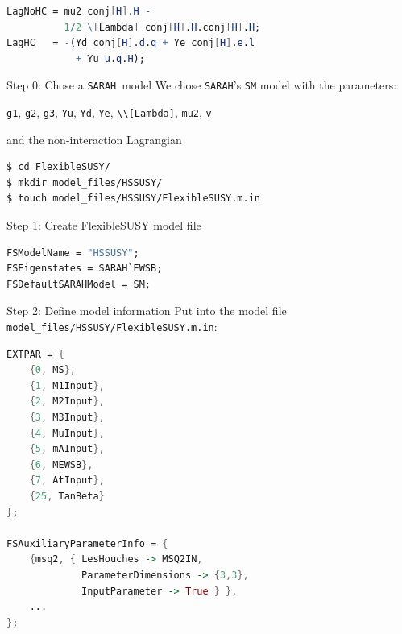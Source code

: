 \documentclass[hyperref={pdfpagelabels=false},ngerman]{beamer}
\newcommand{\SARAH}{\texttt{SARAH}}
\begin{document}
\newsavebox{\listbox}

\begin{lrbox}{\listbox}\begin{lstlisting}[language=Mathematica]
LagNoHC = mu2 conj[H].H -
          1/2 \[Lambda] conj[H].H.conj[H].H;
LagHC   = -(Yd conj[H].d.q + Ye conj[H].e.l
            + Yu u.q.H);
\end{lstlisting}\end{lrbox}

\begin{frame}{Step 0: Chose a \SARAH\ model}
  We chose \SARAH's \texttt{SM} model with the parameters:
  \begin{center}
  \lstinline{g1}, \lstinline{g2}, \lstinline{g3}, \lstinline{Yu},
  \lstinline{Yd}, \lstinline{Ye}, \lstinline{\\[Lambda]},
  \lstinline{mu2}, \lstinline{v}
  \end{center}
  and the non-interaction Lagrangian \\[2em]
  \usebox{\listbox}
\end{frame}

\begin{lrbox}{\listbox}\begin{lstlisting}[language=bash]
$ cd FlexibleSUSY/
$ mkdir model_files/HSSUSY/
$ touch model_files/HSSUSY/FlexibleSUSY.m.in
\end{lstlisting}\end{lrbox} %

\begin{frame}{Step 1: Create FlexibleSUSY model file}
  \usebox{\listbox}
\end{frame}

\begin{lrbox}{\listbox}\begin{lstlisting}[language=Mathematica]
FSModelName = "HSSUSY";
FSEigenstates = SARAH`EWSB;
FSDefaultSARAHModel = SM;
\end{lstlisting}\end{lrbox}

\begin{frame}{Step 2: Define model information}
  Put into the model file
  \lstinline{model_files/HSSUSY/FlexibleSUSY.m.in}:
  \\[2em]
  \usebox{\listbox}
\end{frame}

\begin{lrbox}{\listbox}\begin{lstlisting}[language=Mathematica]
EXTPAR = {
    {0, MS},
    {1, M1Input},
    {2, M2Input},
    {3, M3Input},
    {4, MuInput},
    {5, mAInput},
    {6, MEWSB},
    {7, AtInput},
    {25, TanBeta}
};

FSAuxiliaryParameterInfo = {
    {msq2, { LesHouches -> MSQ2IN,
             ParameterDimensions -> {3,3},
             InputParameter -> True } },
    ...
};
\end{lstlisting}\end{lrbox}
\end{document}
